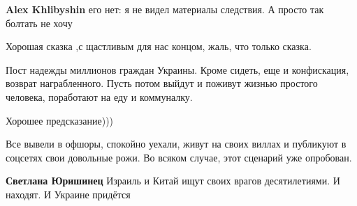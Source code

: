 \begin{itemize}
\begin{itemize}
\textbf{Alex Khlibyshin} его нет: я не видел материалы следствия. А просто так болтать не хочу
\end{itemize}

 
Хорошая сказка ,с щастливым для нас концом, жаль, что только сказка.

 

Пост надежды миллионов граждан Украины. Кроме сидеть, еще и конфискация,
возврат награбленного. Пусть потом выйдут и поживут жизнью простого человека,
поработают на еду и коммуналку.


 
Хорошее предсказание)))

 

Все вывели в офшоры, спокойно уехали, живут на своих виллах и публикуют в
соцсетях свои довольные рожи. Во всяком случае, этот сценарий уже опробован.

\begin{itemize}
 
\textbf{Светлана Юришинец} Израиль и Китай ищут своих врагов десятилетиями. И находят. И Украине придётся

 

\end{itemize}
\end{itemize}
